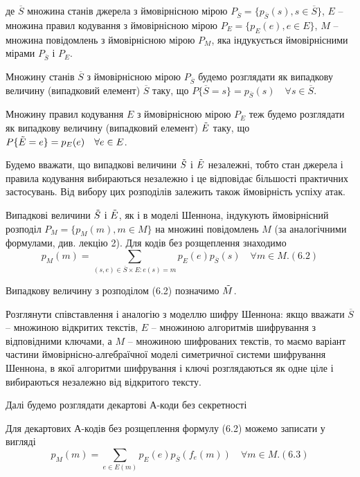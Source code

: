 де $\overline{S}$ множина станів джерела з ймовірнісною мірою $P_{\overline{S}} = \{p_{\overline{S}}(s), s \in \overline{S}\}$,
$E$ -- множина правил кодування з ймовірнісною мірою $P_{E} = \{p_{E}(e), e \in E\}$,
$M$ -- множина повідомлень з ймовірнісною мірою $P_{M}$, яка індукується
ймовірнісними мірами $P_{\overline{S}}$ і $P_{E}$.

Множину станів $\overline{S}$ з ймовірнісною мірою $P_{\overline{S}}$ будемо розглядати як випадкову
величину (випадковий елемент) $\overline{S}$ таку, що $P\{\overline{S} = s\} = p_{\overline{S}}(s) \quad \forall s \in \overline{S}$.

Множину правил кодування $E$ з ймовірнісною мірою $P_E$ теж будемо
розглядати як випадкову величину (випадковий елемент) $\Tilde{E}$ таку, що $P\{\Tilde{E} = e\} = p_{E}(e) \quad \forall e \in E$.

Будемо вважати, що випадкові величини $\Tilde{S}$ і $\Tilde{E}$ незалежні, тобто стан джерела
і правила кодування вибираються незалежно і це відповідає більшості
практичних застосувань. Від вибору цих розподілів залежить також ймовірність
успіху атак.

Випадкові величини $\Tilde{S}$ і $\Tilde{E}$, як і в моделі Шеннона, індукують ймовірнісний
розподіл $P_M = \{p_M(m), m \in M\}$ на множині повідомлень $M$ (за аналогічними
формулами, див. лекцію 2). Для кодів без розщеплення знаходимо
\begin{equation}
    p_M(m) = \sum\limits_{(s, e) \in \overline{S} \times E: e(s) = m} p_E(e) p_{\overline{S}}(s) \quad \forall m \in M. (6.2)
\end{equation}

Випадкову величину з розподілом (6.2) позначимо $\Tilde{M}$.

Розглянути співставлення і аналогію з моделлю шифру Шеннона: якщо
вважати $\overline{S}$ -- множиною відкритих текстів, $E$ -- множиною алгоритмів
шифрування з відповідними ключами, а $M$ -- множиною шифрованих текстів, то
маємо варіант частини ймовірнісно-алгебраїчної моделі симетричної системи
шифрування Шеннона, в якої алгоритми шифрування і ключі розглядаються як
одне ціле і вибираються незалежно від відкритого тексту.

Далі будемо розглядати декартові А-коди без секретності

Для декартових А-кодів без розщеплення формулу (6.2) можемо записати у
вигляді
\begin{equation}
    p_M(m) = \sum\limits_{e \in E(m)} p_E(e) p_{\overline{S}}(f_e(m)) \quad \forall m \in M. (6.3)
\end{equation}

